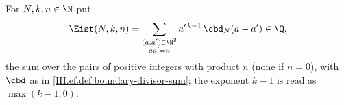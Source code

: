 For $N,k,n\in\N$ put
\[
  \Eist(N,k,n)=\sum_{\substack{(a,a')\in\N^2\\ aa'=n}}a'^{\,k-1}\,\cbd_N(a-a')\in\Q,
\]
the sum over the pairs of positive integers with product $n$ (none if $n=0$), with $\cbd$ as in \cref{III.ef.def:boundary-divisor-sum}; the
exponent $k-1$ is read as $\max(k-1,0)$.
